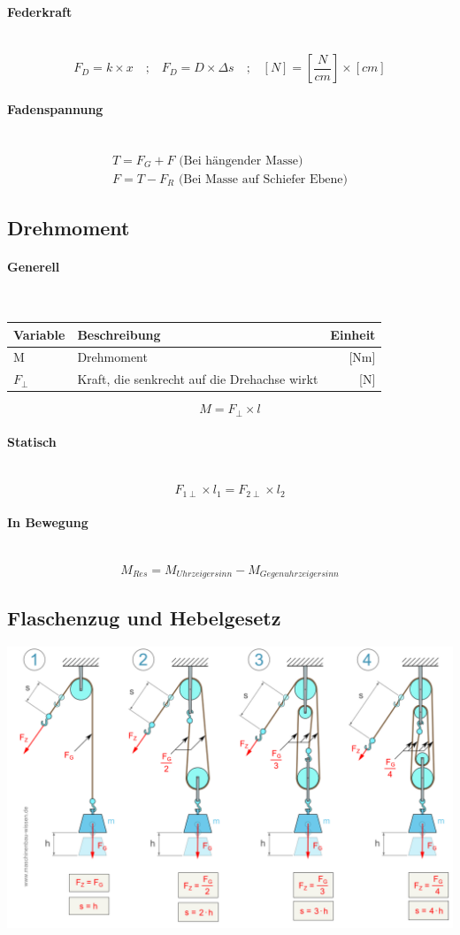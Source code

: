 \documentclass[a4paper,10pt]{article}
\newcommand{\lbparagraph}[1]{\paragraph{#1}\mbox{}\\}
\newcommand{\eqsp}[1]{\quad\textbf{;}\quad}
\begin{document}
\lbparagraph{Federkraft}

\begin{equation}
    F_D = k \times x
    \eqsp{}
    F_D = D \times \Delta{s}
    \eqsp{}
    [N] = [\frac{N}{cm}] \times [cm]
\end{equation}

\lbparagraph{Fadenspannung}

\begin{gather}
    T = F_G + F \text{ (Bei hängender Masse)}
    \\
    F = T - F_R \text{ (Bei Masse auf Schiefer Ebene)}
\end{gather}

\subsection{Drehmoment}

\lbparagraph{Generell}

\begin{tabular}{l|l|r}
    Variable & Beschreibung & Einheit \\
    \hline
    M & Drehmoment & [Nm] \\
    $F_{\perp}$ & Kraft, die senkrecht auf die Drehachse wirkt & [N]
\end{tabular}

\begin{equation}
    M = F_{\perp} \times l
\end{equation}

\lbparagraph{Statisch}

\begin{equation}
    F_{1\perp} \times l_1 = F_{2\perp} \times l_2
\end{equation}

\lbparagraph{In Bewegung}

\begin{equation}
    M_{Res} = M_{Uhrzeigersinn} - M_{Gegenuhrzeigersinn}
\end{equation}

\subsection{Flaschenzug und Hebelgesetz}

\includegraphics[width=\textwidth,height=\textheight,keepaspectratio]{flaschenzug-berechnen}
\end{document}
